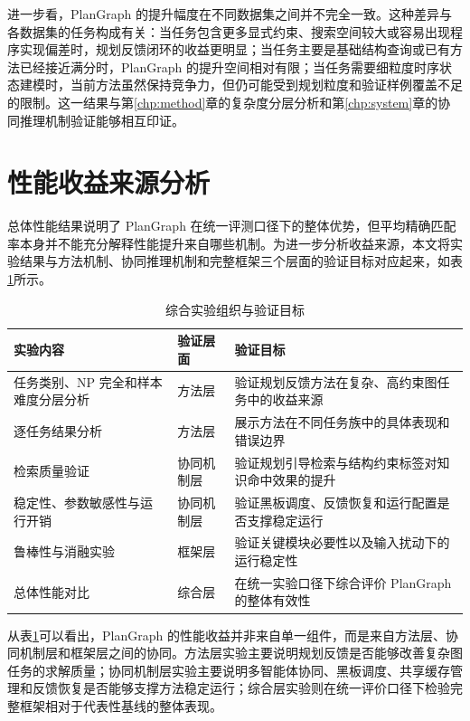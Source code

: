 进一步看，PlanGraph 的提升幅度在不同数据集之间并不完全一致。这种差异与各数据集的任务构成有关：当任务包含更多显式约束、搜索空间较大或容易出现程序实现偏差时，规划反馈闭环的收益更明显；当任务主要是基础结构查询或已有方法已经接近满分时，PlanGraph 的提升空间相对有限；当任务需要细粒度时序状态建模时，当前方法虽然保持竞争力，但仍可能受到规划粒度和验证样例覆盖不足的限制。这一结果与第\ref{chp:method}章的复杂度分层分析和第\ref{chp:system}章的协同推理机制验证能够相互印证。

\section{性能收益来源分析}

总体性能结果说明了 PlanGraph 在统一评测口径下的整体优势，但平均精确匹配率本身并不能充分解释性能提升来自哪些机制。为进一步分析收益来源，本文将实验结果与方法机制、协同推理机制和完整框架三个层面的验证目标对应起来，如表\ref{tab:experiment_mapping}所示。

\begin{table}[htbp]
\centering
\small
\caption{综合实验组织与验证目标}
\label{tab:experiment_mapping}
\begin{tabularx}{\textwidth}{p{3.2cm}p{3.0cm}X}
\toprule
实验内容 & 验证层面 & 验证目标 \\
\midrule
任务类别、NP 完全和样本难度分层分析 & 方法层 & 验证规划反馈方法在复杂、高约束图任务中的收益来源 \\
逐任务结果分析 & 方法层 & 展示方法在不同任务族中的具体表现和错误边界 \\
检索质量验证 & 协同机制层 & 验证规划引导检索与结构约束标签对知识命中效果的提升 \\
稳定性、参数敏感性与运行开销 & 协同机制层 & 验证黑板调度、反馈恢复和运行配置是否支撑稳定运行 \\
鲁棒性与消融实验 & 框架层 & 验证关键模块必要性以及输入扰动下的运行稳定性 \\
总体性能对比 & 综合层 & 在统一实验口径下综合评价 PlanGraph 的整体有效性 \\
\bottomrule
\end{tabularx}
\end{table}

从表\ref{tab:experiment_mapping}可以看出，PlanGraph 的性能收益并非来自单一组件，而是来自方法层、协同机制层和框架层之间的协同。方法层实验主要说明规划反馈是否能够改善复杂图任务的求解质量；协同机制层实验主要说明多智能体协同、黑板调度、共享缓存管理和反馈恢复是否能够支撑方法稳定运行；综合层实验则在统一评价口径下检验完整框架相对于代表性基线的整体表现。


